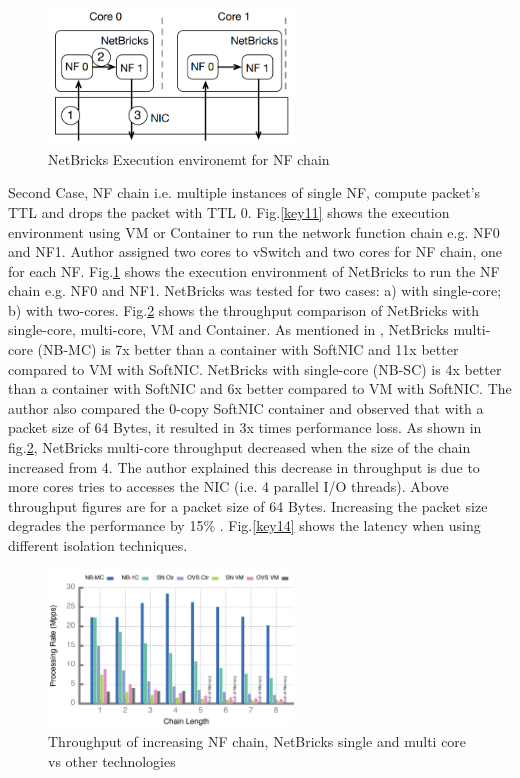 \documentclass[10pt, a4paper, conference]{IEEEtran}
\begin{document}
\begin{figure}
	\centering
	\includegraphics[width=65mm]{figures/fig10}
	\caption{NetBricks Execution environemt for NF chain\cite{Panda2016}}
	\label{key12}
\end{figure}

Second Case, NF chain i.e. multiple instances of single NF, compute packet’s TTL  and drops the packet with TTL 0\cite{Panda2016}. Fig.\ref{key11} shows the execution environment using VM or Container to run the network function chain e.g. NF0 and NF1. Author assigned two cores to vSwitch and two cores for NF chain, one for each NF. Fig.\ref{key12} shows the execution environment of NetBricks to run the NF chain e.g. NF0 and NF1. NetBricks was tested for two cases\cite{Panda2016}: a) with single-core; b) with two-cores. Fig.\ref{key13} shows the throughput comparison of NetBricks with single-core, multi-core, VM and Container. As mentioned in \cite{Panda2016}, NetBricks multi-core (NB-MC) is 7x better than a container with SoftNIC and 11x better compared to VM with SoftNIC\cite{Panda2016}. NetBricks with single-core (NB-SC) is 4x better than a container with SoftNIC and 6x better compared to VM with SoftNIC\cite{Panda2016}. The author also compared the 0-copy SoftNIC container and observed that with a packet size of 64 Bytes, it resulted in 3x times performance loss. As shown in fig.\ref{key13}, NetBricks multi-core throughput decreased when the size of the chain increased from 4. The author explained this decrease in throughput is due to more cores tries to accesses the NIC (i.e. 4 parallel I/O threads)\cite{Panda2016}. Above throughput figures are for a packet size of 64 Bytes. Increasing the packet size degrades the performance by 15\% \cite{Panda2016}. Fig.\ref{key14} shows the latency when using different isolation techniques.
\begin{figure}
	\centering
	\includegraphics[width=65mm]{figures/fig11}
	\caption{Throughput of increasing NF chain, NetBricks single and multi core vs other technologies\cite{Panda2016}}
	\label{key13}
\end{figure}
\end{document}
